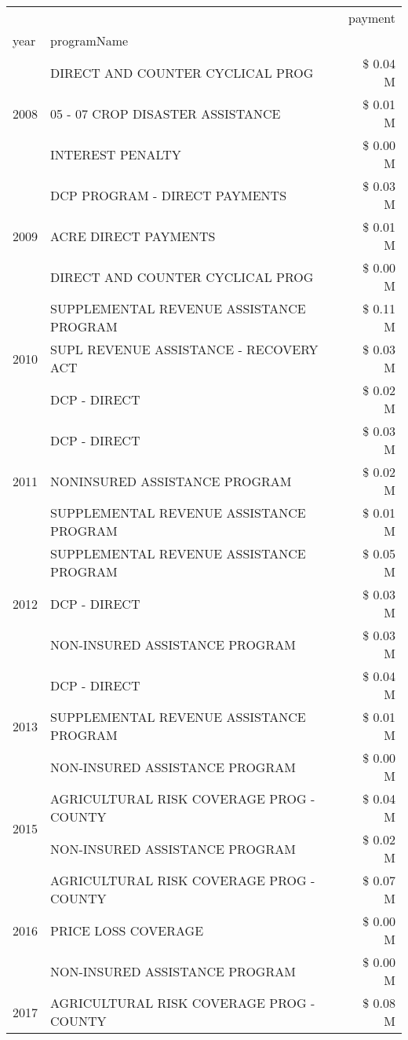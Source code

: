\begin{tabular}{llr}
\toprule
 &  & payment \\
year & programName &  \\
\midrule
\multirow[t]{3}{*}{2008} & DIRECT AND COUNTER CYCLICAL PROG & \$ 0.04 M \\
 & 05 - 07 CROP DISASTER ASSISTANCE & \$ 0.01 M \\
 & INTEREST PENALTY & \$ 0.00 M \\
\cline{1-3}
\multirow[t]{3}{*}{2009} & DCP PROGRAM - DIRECT PAYMENTS & \$ 0.03 M \\
 & ACRE DIRECT PAYMENTS & \$ 0.01 M \\
 & DIRECT AND COUNTER CYCLICAL PROG & \$ 0.00 M \\
\cline{1-3}
\multirow[t]{3}{*}{2010} & SUPPLEMENTAL REVENUE ASSISTANCE PROGRAM & \$ 0.11 M \\
 & SUPL REVENUE ASSISTANCE - RECOVERY ACT & \$ 0.03 M \\
 & DCP - DIRECT & \$ 0.02 M \\
\cline{1-3}
\multirow[t]{3}{*}{2011} & DCP - DIRECT & \$ 0.03 M \\
 & NONINSURED ASSISTANCE PROGRAM & \$ 0.02 M \\
 & SUPPLEMENTAL REVENUE ASSISTANCE PROGRAM & \$ 0.01 M \\
\cline{1-3}
\multirow[t]{3}{*}{2012} & SUPPLEMENTAL REVENUE ASSISTANCE PROGRAM & \$ 0.05 M \\
 & DCP - DIRECT & \$ 0.03 M \\
 & NON-INSURED ASSISTANCE PROGRAM & \$ 0.03 M \\
\cline{1-3}
\multirow[t]{3}{*}{2013} & DCP - DIRECT & \$ 0.04 M \\
 & SUPPLEMENTAL REVENUE ASSISTANCE PROGRAM & \$ 0.01 M \\
 & NON-INSURED ASSISTANCE PROGRAM & \$ 0.00 M \\
\cline{1-3}
\multirow[t]{2}{*}{2015} & AGRICULTURAL RISK COVERAGE PROG - COUNTY & \$ 0.04 M \\
 & NON-INSURED ASSISTANCE PROGRAM & \$ 0.02 M \\
\cline{1-3}
\multirow[t]{3}{*}{2016} & AGRICULTURAL RISK COVERAGE PROG - COUNTY & \$ 0.07 M \\
 & PRICE LOSS COVERAGE & \$ 0.00 M \\
 & NON-INSURED ASSISTANCE PROGRAM & \$ 0.00 M \\
\cline{1-3}
\multirow[t]{3}{*}{2017} & AGRICULTURAL RISK COVERAGE PROG - COUNTY & \$ 0.08 M \\

\end{tabular}

